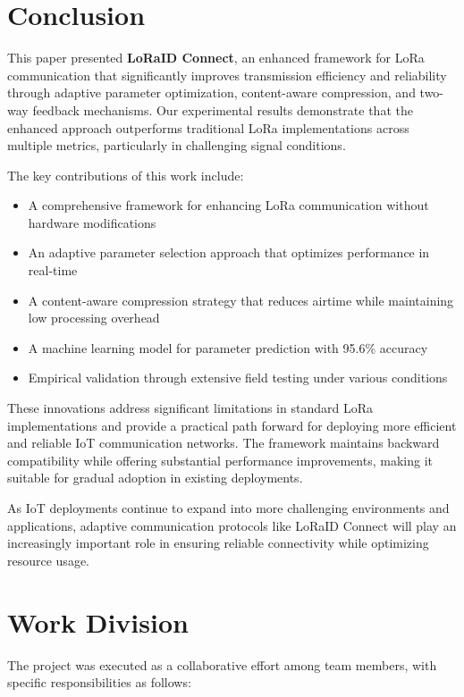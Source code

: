 \documentclass[conference]{IEEEtran}
\begin{document}
\section{Conclusion}
This paper presented \textbf{LoRaID Connect}, an enhanced framework for LoRa communication that significantly improves transmission efficiency and reliability through adaptive parameter optimization, content-aware compression, and two-way feedback mechanisms. Our experimental results demonstrate that the enhanced approach outperforms traditional LoRa implementations across multiple metrics, particularly in challenging signal conditions.

The key contributions of this work include:
\begin{itemize}
    \item A comprehensive framework for enhancing LoRa communication without hardware modifications
    \item An adaptive parameter selection approach that optimizes performance in real-time
    \item A content-aware compression strategy that reduces airtime while maintaining low processing overhead
    \item A machine learning model for parameter prediction with 95.6\% accuracy
    \item Empirical validation through extensive field testing under various conditions
\end{itemize}

These innovations address significant limitations in standard LoRa implementations and provide a practical path forward for deploying more efficient and reliable IoT communication networks. The framework maintains backward compatibility while offering substantial performance improvements, making it suitable for gradual adoption in existing deployments.

As IoT deployments continue to expand into more challenging environments and applications, adaptive communication protocols like LoRaID Connect will play an increasingly important role in ensuring reliable connectivity while optimizing resource usage.

\section{Work Division}
The project was executed as a collaborative effort among team members, with specific responsibilities as follows:
\end{document}

